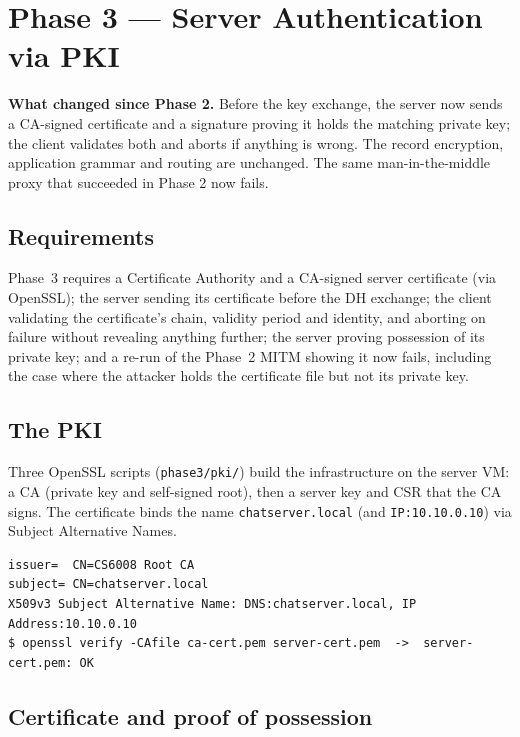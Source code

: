 \documentclass[11pt,a4paper]{article}
\begin{document}
\section{Phase 3 --- Server Authentication via PKI}

\begin{keybox}
\textbf{What changed since Phase 2.} Before the key exchange, the server now sends a CA-signed
certificate and a signature proving it holds the matching private key; the client validates both and
aborts if anything is wrong. The record encryption, application grammar and routing are unchanged. The
same man-in-the-middle proxy that succeeded in Phase 2 now fails.
\end{keybox}

\subsection{Requirements}

Phase~3 requires a Certificate Authority and a CA-signed server certificate (via OpenSSL); the server
sending its certificate before the DH exchange; the client validating the certificate's chain,
validity period and identity, and aborting on failure without revealing anything further; the server
proving possession of its private key; and a re-run of the Phase~2 MITM showing it now fails, including
the case where the attacker holds the certificate file but not its private key.

\subsection{The PKI}

Three OpenSSL scripts (\texttt{phase3/pki/}) build the infrastructure on the server VM: a CA (private
key and self-signed root), then a server key and CSR that the CA signs. The certificate binds the name
\texttt{chatserver.local} (and \texttt{IP:10.10.0.10}) via Subject Alternative Names.

\begin{lstlisting}
issuer=  CN=CS6008 Root CA
subject= CN=chatserver.local
X509v3 Subject Alternative Name: DNS:chatserver.local, IP Address:10.10.0.10
$ openssl verify -CAfile ca-cert.pem server-cert.pem  ->  server-cert.pem: OK
\end{lstlisting}

\subsection{Certificate and proof of possession}
\end{document}
